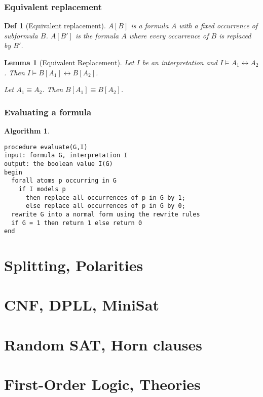 \documentclass[]{article}
\newtheorem{lemma}{Lemma}
\newtheorem*{definition*}{Def}
\newtheorem{algorithm}{Algorithm}
\begin{document}
\subsubsection{Equivalent replacement}
\begin{definition*}[Equivalent replacement]
	$A[B]$ is a formula $A$ with a fixed occurrence of subformula $B$. $A[B']$ is the formula $A$ where every occurrence of $B$ is replaced by $B'$.
\end{definition*}

\begin{lemma}[Equivalent Replacement]
	Let $I$ be an interpretation and $I \models A_1 \leftrightarrow A_2$. Then $I \models B[A_1] \leftrightarrow B[A_2]$.
	
	Let $A_1 \equiv A_2$. Then $B[A_1] \equiv B[A_2]$.
\end{lemma}


\subsubsection{Evaluating a formula}
\begin{algorithm}
\begin{lstlisting}
procedure evaluate(G,I)
input: formula G, interpretation I
output: the boolean value I(G)
begin
  forall atoms p occurring in G
    if I models p
      then replace all occurrences of p in G by 1;
      else replace all occurrences of p in G by 0;
  rewrite G into a normal form using the rewrite rules
  if G = 1 then return 1 else return 0
end
	\end{lstlisting}
\end{algorithm}

\section{Splitting, Polarities}

\section{CNF, DPLL, MiniSat}

\section{Random SAT, Horn clauses}

\section{First-Order Logic, Theories}
\end{document}
